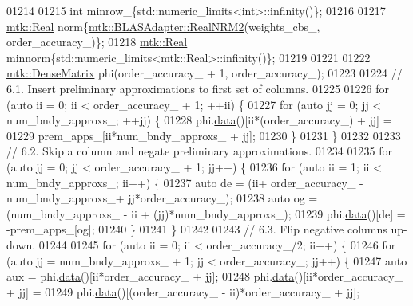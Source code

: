 \begin{DoxyCode}
{{01214 
01215     \textcolor{keywordtype}{int} minrow\_\{std::numeric\_limits<int>::infinity()\};
01216 
01217     \hyperlink{group__c01-roots_gac080bbbf5cbb5502c9f00405f894857d}{mtk::Real} norm\{\hyperlink{classmtk_1_1BLASAdapter_ab92440888b730863244c5d9479c11aca}{mtk::BLASAdapter::RealNRM2}(weights\_cbs\_,
      order\_accuracy\_)\};
01218     \hyperlink{group__c01-roots_gac080bbbf5cbb5502c9f00405f894857d}{mtk::Real} minnorm\{std::numeric\_limits<mtk::Real>::infinity()\};
01219 
01221 
01222     \hyperlink{classmtk_1_1DenseMatrix}{mtk::DenseMatrix} phi(order\_accuracy\_ + 1, order\_accuracy\_);
01223 
01224     \textcolor{comment}{// 6.1. Insert preliminary approximations to first set of columns.}
01225 
01226     \textcolor{keywordflow}{for} (\textcolor{keyword}{auto} ii = 0; ii < order\_accuracy\_ + 1; ++ii) \{
01227       \textcolor{keywordflow}{for} (\textcolor{keyword}{auto} jj = 0; jj < num\_bndy\_approxs\_; ++jj) \{
01228         phi.\hyperlink{classmtk_1_1DenseMatrix_a16b3ff56feb2658b9fc7147d1de4d8e7}{data}()[ii*(order\_accuracy\_) + jj] =
01229           prem\_apps\_[ii*num\_bndy\_approxs\_ + jj];
01230       \}
01231     \}
01232 
01233     \textcolor{comment}{// 6.2. Skip a column and negate preliminary approximations.}
01234 
01235     \textcolor{keywordflow}{for} (\textcolor{keyword}{auto} jj = 0; jj < order\_accuracy\_ + 1; jj++) \{
01236       \textcolor{keywordflow}{for} (\textcolor{keyword}{auto} ii = 1; ii < num\_bndy\_approxs\_; ii++) \{
01237         \textcolor{keyword}{auto} de = (ii+ order\_accuracy\_ - num\_bndy\_approxs\_+ jj*order\_accuracy\_);
01238         \textcolor{keyword}{auto} og = (num\_bndy\_approxs\_ - ii + (jj)*num\_bndy\_approxs\_);
01239         phi.\hyperlink{classmtk_1_1DenseMatrix_a16b3ff56feb2658b9fc7147d1de4d8e7}{data}()[de] = -prem\_apps\_[og];
01240       \}
01241     \}
01242 
01243     \textcolor{comment}{// 6.3. Flip negative columns up-down.}
01244 
01245     \textcolor{keywordflow}{for} (\textcolor{keyword}{auto} ii = 0; ii < order\_accuracy\_/2; ii++) \{
01246       \textcolor{keywordflow}{for} (\textcolor{keyword}{auto} jj = num\_bndy\_approxs\_ + 1; jj < order\_accuracy\_; jj++) \{
01247         \textcolor{keyword}{auto} aux = phi.\hyperlink{classmtk_1_1DenseMatrix_a16b3ff56feb2658b9fc7147d1de4d8e7}{data}()[ii*order\_accuracy\_ + jj];
01248         phi.\hyperlink{classmtk_1_1DenseMatrix_a16b3ff56feb2658b9fc7147d1de4d8e7}{data}()[ii*order\_accuracy\_ + jj] =
01249           phi.\hyperlink{classmtk_1_1DenseMatrix_a16b3ff56feb2658b9fc7147d1de4d8e7}{data}()[(order\_accuracy\_ - ii)*order\_accuracy\_ + jj];
}}
\end{DoxyCode}
